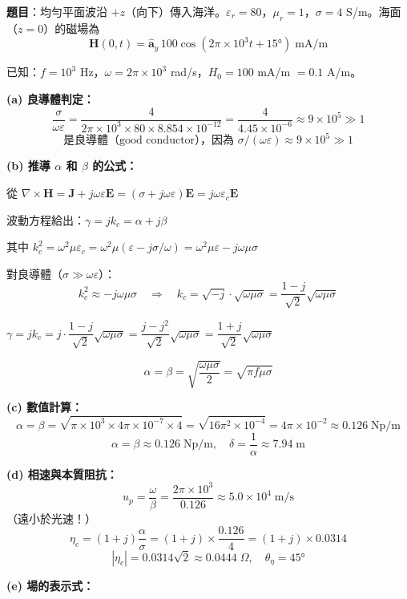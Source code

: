 \documentclass[12pt,a4paper]{article}
\newcommand{\vE}{\mathbf{E}}
\newcommand{\vH}{\mathbf{H}}
\newcommand{\vJ}{\mathbf{J}}
\newcommand{\ay}{\hat{\mathbf{a}}_y}
\begin{document}
\textbf{題目}：均勻平面波沿 $+z$（向下）傳入海洋。$\varepsilon_r = 80$，$\mu_r = 1$，$\sigma = 4$ S/m。海面（$z=0$）的磁場為
\[
  \vH(0,t) = \ay\,100\cos(2\pi\times10^3 t + 15°) \;\text{mA/m}
\]

\begin{solutionbox}[詳解]

已知：$f = 10^3$ Hz，$\omega = 2\pi\times10^3$ rad/s，$H_0 = 100$ mA/m $= 0.1$ A/m。

\textbf{(a) 良導體判定：}
\[
  \frac{\sigma}{\omega\varepsilon} = \frac{4}{2\pi\times10^3 \times 80\times8.854\times10^{-12}}
  = \frac{4}{4.45\times10^{-6}} \approx 9\times10^5 \gg 1
\]
\[
  \boxed{\text{是良導體（good conductor），因為 }\sigma/(\omega\varepsilon) \approx 9\times10^5 \gg 1}
\]

\textbf{(b) 推導 $\alpha$ 和 $\beta$ 的公式：}

從 $\nabla\times\vH = \vJ + j\omega\varepsilon\vE = (\sigma + j\omega\varepsilon)\vE = j\omega\varepsilon_c\vE$

波動方程給出：$\gamma = j k_c = \alpha + j\beta$

其中 $k_c^2 = \omega^2\mu\varepsilon_c = \omega^2\mu(\varepsilon - j\sigma/\omega) = \omega^2\mu\varepsilon - j\omega\mu\sigma$

對良導體（$\sigma \gg \omega\varepsilon$）：
\[
  k_c^2 \approx -j\omega\mu\sigma \quad\Rightarrow\quad k_c = \sqrt{-j}\cdot\sqrt{\omega\mu\sigma} = \frac{1-j}{\sqrt{2}}\sqrt{\omega\mu\sigma}
\]

$\gamma = jk_c = j\cdot\dfrac{1-j}{\sqrt{2}}\sqrt{\omega\mu\sigma} = \dfrac{j-j^2}{\sqrt{2}}\sqrt{\omega\mu\sigma} = \dfrac{1+j}{\sqrt{2}}\sqrt{\omega\mu\sigma}$

\[
  \boxed{\alpha = \beta = \sqrt{\frac{\omega\mu\sigma}{2}} = \sqrt{\pi f\mu\sigma}}
\]

\textbf{(c) 數值計算：}
\[
  \alpha = \beta = \sqrt{\pi\times10^3\times4\pi\times10^{-7}\times4}
  = \sqrt{16\pi^2\times10^{-4}} = 4\pi\times10^{-2} \approx 0.126\;\text{Np/m}
\]
\[
  \boxed{\alpha = \beta \approx 0.126\;\text{Np/m}, \quad \delta = \frac{1}{\alpha} \approx 7.94\;\text{m}}
\]

\textbf{(d) 相速與本質阻抗：}
\[
  \boxed{u_p = \frac{\omega}{\beta} = \frac{2\pi\times10^3}{0.126} \approx 5.0\times10^4\;\text{m/s}}
\]
（遠小於光速！）
\[
  \eta_c = (1+j)\frac{\alpha}{\sigma} = (1+j)\times\frac{0.126}{4} = (1+j)\times0.0314
\]
\[
  \boxed{|\eta_c| = 0.0314\sqrt{2} \approx 0.0444\;\Omega, \quad \theta_\eta = 45°}
\]

\textbf{(e) 場的表示式：}


\end{solutionbox}
\end{document}
